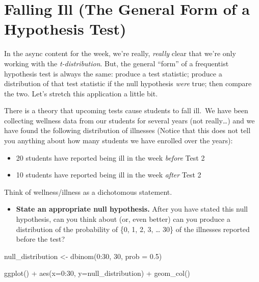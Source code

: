 \documentclass[
]{book}
\newenvironment{Shaded}{\begin{snugshade}}{\end{snugshade}}
\newcommand{\AttributeTok}[1]{\textcolor[rgb]{0.77,0.63,0.00}{#1}}
\newcommand{\DecValTok}[1]{\textcolor[rgb]{0.00,0.00,0.81}{#1}}
\newcommand{\FloatTok}[1]{\textcolor[rgb]{0.00,0.00,0.81}{#1}}
\newcommand{\FunctionTok}[1]{\textcolor[rgb]{0.00,0.00,0.00}{#1}}
\newcommand{\NormalTok}[1]{#1}
\newcommand{\OtherTok}[1]{\textcolor[rgb]{0.56,0.35,0.01}{#1}}
\newcommand{\SpecialCharTok}[1]{\textcolor[rgb]{0.00,0.00,0.00}{#1}}
\providecommand{\tightlist}{%
  \setlength{\itemsep}{0pt}\setlength{\parskip}{0pt}}
\theoremstyle{definition}
\theoremstyle{definition}
\theoremstyle{definition}
\theoremstyle{definition}
\theoremstyle{remark}
\begin{document}
\hypertarget{falling-ill-the-general-form-of-a-hypothesis-test}{%
\section{Falling Ill (The General Form of a Hypothesis Test)}\label{falling-ill-the-general-form-of-a-hypothesis-test}}

In the async content for the week, we're really, \emph{really} clear that we're only working with the \emph{t-distribution}. But, the general ``form'' of a frequentist hypothesis test is always the same: produce a test statistic; produce a distribution of that test statistic if the null hypothesis \emph{were} true; then compare the two. Let's stretch this application a little bit.

There is a theory that upcoming tests cause students to fall ill.~We have been collecting wellness data from our students for several years (not really\ldots) and we have found the following distribution of illnesses (Notice that this does not tell you anything about how many students we have enrolled over the years):

\begin{itemize}
\item
  20 students have reported being ill in the week \emph{before} Test 2
\item
  10 students have reported being ill in the week \emph{after} Test 2
\end{itemize}

Think of wellness/illness as a dichotomous statement.

\begin{itemize}
\tightlist
\item
  \textbf{State an appropriate null hypothesis.} After you have stated this null hypothesis, can you think about (or, even better) can you produce a distribution of the probability of \{0, 1, 2, 3, \ldots{} 30\} of the illnesses reported before the test?
\end{itemize}

\begin{Shaded}
\begin{Highlighting}[]
\NormalTok{null\_distribution }\OtherTok{\textless{}{-}} \FunctionTok{dbinom}\NormalTok{(}\DecValTok{0}\SpecialCharTok{:}\DecValTok{30}\NormalTok{, }\DecValTok{30}\NormalTok{, }\AttributeTok{prob =} \FloatTok{0.5}\NormalTok{)}

\FunctionTok{ggplot}\NormalTok{() }\SpecialCharTok{+} 
  \FunctionTok{aes}\NormalTok{(}\AttributeTok{x=}\DecValTok{0}\SpecialCharTok{:}\DecValTok{30}\NormalTok{, }\AttributeTok{y=}\NormalTok{null\_distribution) }\SpecialCharTok{+} 
  \FunctionTok{geom\_col}\NormalTok{()}
\end{Highlighting}
\end{Shaded}
\end{document}
